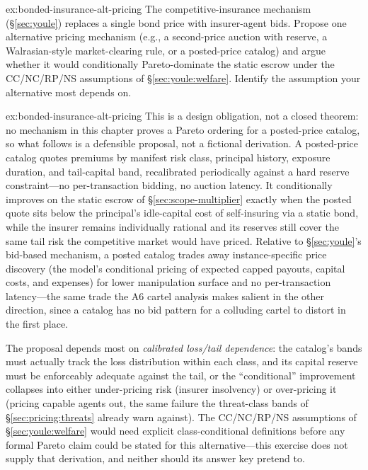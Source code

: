 \documentclass[11pt,a4paper]{article}
\theoremstyle{definition}
\theoremstyle{remark}
\begin{document}
\begin{pdexercise}[kind=Open,rating=3]{ex:bonded-insurance-alt-pricing}
The competitive-insurance mechanism (\S\ref{sec:youle}) replaces a single bond price with insurer-agent bids. Propose one alternative pricing mechanism (e.g., a second-price auction with reserve, a Walrasian-style market-clearing rule, or a posted-price catalog) and argue whether it would conditionally Pareto-dominate the static escrow under the CC/NC/RP/NS assumptions of \S\ref{sec:youle:welfare}. Identify the assumption your alternative most depends on.
\end{pdexercise}
\begin{pdsolution}{ex:bonded-insurance-alt-pricing}
This is a design obligation, not a closed theorem: no mechanism in this chapter proves a Pareto ordering for a posted-price catalog, so what follows is a defensible proposal, not a fictional derivation. A posted-price catalog quotes premiums by manifest risk class, principal history, exposure duration, and tail-capital band, recalibrated periodically against a hard reserve constraint---no per-transaction bidding, no auction latency. It conditionally improves on the static escrow of \S\ref{sec:scope-multiplier} exactly when the posted quote sits below the principal's idle-capital cost of self-insuring via a static bond, while the insurer remains individually rational and its reserves still cover the same tail risk the competitive market would have priced. Relative to \S\ref{sec:youle}'s bid-based mechanism, a posted catalog trades away instance-specific price discovery (the model's conditional pricing of expected capped payouts, capital costs, and expenses) for lower manipulation surface and no per-transaction latency---the same trade the A6 cartel analysis makes salient in the other direction, since a catalog has no bid pattern for a colluding cartel to distort in the first place.

The proposal depends most on \emph{calibrated loss/tail dependence}: the catalog's bands must actually track the loss distribution within each class, and its capital reserve must be enforceably adequate against the tail, or the ``conditional'' improvement collapses into either under-pricing risk (insurer insolvency) or over-pricing it (pricing capable agents out, the same failure the threat-class bands of \S\ref{sec:pricing:threats} already warn against). The CC/NC/RP/NS assumptions of \S\ref{sec:youle:welfare} would need explicit class-conditional definitions before any formal Pareto claim could be stated for this alternative---this exercise does not supply that derivation, and neither should its answer key pretend to.
\end{pdsolution}
\end{document}
